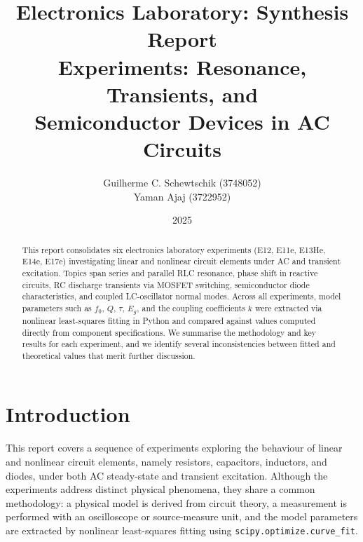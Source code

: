 \documentclass[a4paper, 10pt]{article}
\title{%
  \large\textbf{Electronics Laboratory: Synthesis Report}\\[4pt]
  \normalsize Experiments: Resonance, Transients, and\\
  Semiconductor Devices in AC Circuits
}
\author{
Guilherme C. Schewtschik (3748052)\\
Yaman Ajaj (3722952)
}
\date{2025}
\begin{document}
\maketitle

\begin{abstract}
\noindent
This report consolidates six electronics laboratory experiments (E12, E11e,
E13He, E14e, E17e) investigating linear and nonlinear circuit elements under
AC and transient excitation. Topics span series and parallel RLC resonance,
phase shift in reactive circuits, RC discharge transients via MOSFET
switching, semiconductor diode characteristics, and coupled LC-oscillator
normal modes. Across all experiments, model parameters such as $f_0$, $Q$,
$\tau$, $E_g$, and the coupling coefficients $k$ were extracted via
nonlinear least-squares fitting in Python and compared against values
computed directly from component specifications. We summarise the
methodology and key results for each experiment, and we identify several
inconsistencies between fitted and theoretical values that merit further
discussion.
\end{abstract}

\section{Introduction}

This report covers a sequence of experiments exploring the behaviour of
linear and nonlinear circuit elements, namely resistors, capacitors,
inductors, and diodes, under both AC steady-state and transient excitation.
Although the experiments address distinct physical phenomena, they share a
common methodology: a physical model is derived from circuit theory, a
measurement is performed with an oscilloscope or source-measure unit, and
the model parameters are extracted by nonlinear least-squares fitting using
\texttt{scipy.optimize.curve\_fit}.
\end{document}
